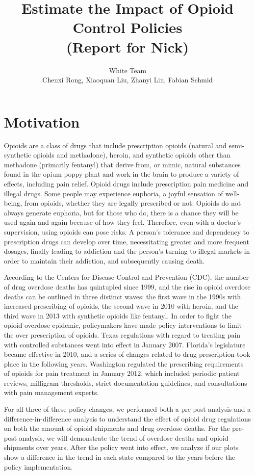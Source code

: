 \documentclass[12pt,letterpaper]{article}
\author{White Team \\ Chenxi Rong, Xiaoquan Liu, Zhanyi Lin, Fabian Schmid}
\title{Estimate the Impact of Opioid Control Policies \\ (Report for Nick)}
\begin{document}
\maketitle

\section{Motivation}
Opioids are a class of drugs that include prescription opioids (natural and semi-synthetic opioids and methadone), heroin, and synthetic opioids other than methadone (primarily fentanyl) that derive from, or mimic, natural substances found in the opium poppy plant and work in the brain to produce a variety of effects, including pain relief. Opioid drugs include prescription pain medicine and illegal drugs. Some people may experience euphoria, a joyful sensation of well-being, from opioids, whether they are legally prescribed or not. Opioids do not always generate euphoria, but for those who do, there is a chance they will be used again and again because of how they feel. Therefore, even with a doctor's supervision, using opioids can pose risks. A person's tolerance and dependency to prescription drugs can develop over time, necessitating greater and more frequent dosages, finally leading to addiction and the person's turning to illegal markets in order to maintain their addiction, and subsequently causing death.

According to the Centers for Disease Control and Prevention (CDC), the number of drug overdose deaths has quintupled since 1999, and the rise in opioid overdose deaths can be outlined in three distinct waves: the first wave in the 1990s with increased prescribing of opioids, the second wave in 2010 with heroin, and the third wave in 2013 with synthetic opioids like fentanyl. In order to fight the opioid overdose epidemic, policymakers have made policy interventions to limit the over prescription of opioids. Texas regulations with regard to treating pain with controlled substances went into effect in January 2007. Florida’s legislature became effective in 2010, and a series of changes related to drug prescription took place in the following years. Washington regulated the prescribing requirements of opioids for pain treatment in January 2012, which included periodic patient reviews, milligram thresholds, strict documentation guidelines, and consultations with pain management experts.

For all three of these policy changes, we performed both a pre-post analysis and a difference-in-difference analysis to understand the effect of opioid drug regulations on both the amount of opioid shipments and drug overdose deaths. For the pre-post analysis, we will demonstrate the trend of overdose deaths and opioid shipments over years. After the policy went into effect, we analyze if our plots show a difference in the trend in each state compared to the years before the policy implementation.
\end{document}

